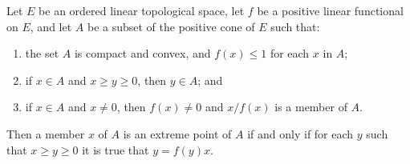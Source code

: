 Let $E$ be an ordered linear topological space, let $f$ be a positive linear functional on $E$, and let $A$ be a subset of the positive cone of $E$ such that:
\begin{enumerate}
\item[(i)] the set $A$ is compact and convex, and $f(x) \leq 1$ for each $x$ in $A$;
\item[(ii)] if $x \in A$ and $x \geq y \geq 0$, then $y \in A$; and
\item[(iii)] if $x \in A$ and $x \neq 0$, then $f(x) \neq 0$ and $x/f(x)$ is a member of $A$.
\end{enumerate}
Then a member $x$ of $A$ is an extreme point of $A$ if and only if for each $y$ such that $x \geq y \geq 0$ it is true that $y = f(y)x$.
